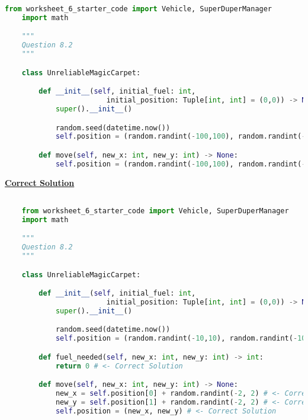 \documentclass[12pt]{article}
\begin{document}
\begin{lstlisting}[language=Python]
    from worksheet_6_starter_code import Vehicle, SuperDuperManager
    import math

    """
    Question 8.2
    """

    class UnreliableMagicCarpet:

        def __init__(self, initial_fuel: int,
                        initial_position: Tuple[int, int] = (0,0)) -> None:
            super().__init__()

            random.seed(datetime.now())
            self.position = (random.randint(-100,100), random.randint(-100,100))

        def move(self, new_x: int, new_y: int) -> None:
            self.position = (random.randint(-100,100), random.randint(-100,100))

\end{lstlisting}

\bigskip

\begin{mdframed}
    \underline{\textbf{Correct Solution}}

    \bigskip

    \begin{lstlisting}[language=Python]

    from worksheet_6_starter_code import Vehicle, SuperDuperManager
    import math

    """
    Question 8.2
    """

    class UnreliableMagicCarpet:

        def __init__(self, initial_fuel: int,
                        initial_position: Tuple[int, int] = (0,0)) -> None:
            super().__init__()

            random.seed(datetime.now())
            self.position = (random.randint(-10,10), random.randint(-10,10)) #<- Correct solution

        def fuel_needed(self, new_x: int, new_y: int) -> int:
            return 0 # <- Correct Solution

        def move(self, new_x: int, new_y: int) -> None:
            new_x = self.position[0] + random.randint(-2, 2) # <- Correct Solution
            new_y = self.position[1] + random.randint(-2, 2) # <- Correct Solution
            self.position = (new_x, new_y) # <- Correct Solution

    \end{lstlisting}

\end{mdframed}
\end{document}
